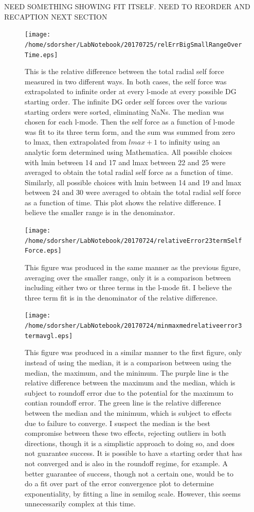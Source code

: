 NEED SOMETHING SHOWING FIT ITSELF. NEED TO REORDER AND RECAPTION NEXT SECTION

\begin{figure}
  \texttt{[image: /home/sdorsher/LabNotebook/20170725/relErrBigSmallRangeOverTime.eps]}
  \caption{This is the relative difference between the total radial self force measured in two different ways. In both cases, the self force was extrapolated to infinite order at every l-mode at every possible DG starting order. The infinite DG order self forces over the various starting orders were sorted, eliminating NaNs. The median was chosen for each l-mode. Then the self force as a function of l-mode was fit to its three term form, and the sum was summed from zero to lmax, then extrapolated from $lmax +1 $ to infinity using an analytic form determined using Mathematica. All possible choices with lmin between 14 and 17 and lmax between 22 and 25 were averaged to obtain the total radial self force as a function of time. Similarly, all possible choices with lmin between 14 and 19 and lmax between 24 and 30 were averaged to obtain the total radial self force as a function of time. This plot shows the relative difference. I believe the smaller range is in the denominator.}
\end{figure}

\newpage

\begin{figure}
  \texttt{[image: /home/sdorsher/LabNotebook/20170724/relativeError23termSelfForce.eps]}
  \caption{This figure was produced in the same manner as the previous figure, averaging over the smaller range, only it is a comparison between including either two or three terms in the l-mode fit. I believe the three term fit is in the denominator of the relative difference.}
\end{figure}

\begin{figure}
  \texttt{[image: /home/sdorsher/LabNotebook/20170724/minmaxmedrelativeerror3termavgl.eps]}
  \caption{This figure was produced in a similar manner to the first figure, only instead of using the median, it is a comparison between using the median, the maximum, and the minimum. The purple line is the relative difference between the maximum and the median, which is subject to roundoff error due to the potential for the maximum to contian roundoff error. The green line is the relative difference between the median and the minimum, which is subject to effects due to failure to converge. I suspect the median is the best compromise between these two effects, rejecting outliers in both directions, though it is a simplistic approach to doing so, and does not guarantee success. It is possible to have a starting order that has not converged and is also in the roundoff regime, for example. A better guarantee of success, though not a certain one, would be to do a fit over part of the error convergence plot to determine exponentiality, by fitting a line in semilog scale. However, this seems unnecessarily complex at this time.}
\end{figure}
  
